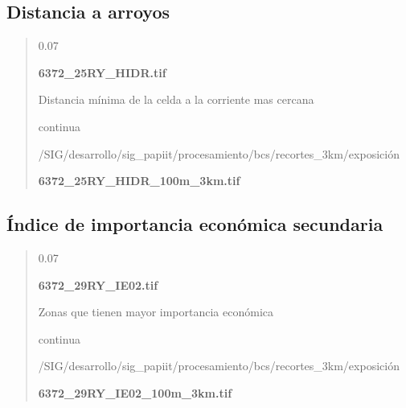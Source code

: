 \documentclass[letterpaper,10pt,spanish]{sphinxmanual}
\begin{document}
\subsection{Distancia a arroyos}
\label{\detokenize{exposicion_bcs:distancia-a-arroyos}}
\begin{quote}

 0.07

 {\color{red}\bfseries{}\textbar{}6372\_25RY\_HIDR.tif\textbar{}}

 Distancia mínima  de la celda  a la corriente mas cercana

 continua


 /SIG/desarrollo/sig\_papiit/procesamiento/bcs/recortes\_3km/exposición

  {\color{red}\bfseries{}\textbar{}6372\_25RY\_HIDR\_100m\_3km.tif\textbar{}}
\begin{quote}

   \textbar{}\textbar{}
\end{quote}
\end{quote}


\subsection{Índice de importancia económica secundaria}
\label{\detokenize{exposicion_bcs:indice-de-importancia-economica-secundaria}}
\begin{quote}

 0.07

 {\color{red}\bfseries{}\textbar{}6372\_29RY\_IE02.tif\textbar{}}

 Zonas que tienen mayor importancia económica

 continua


 /SIG/desarrollo/sig\_papiit/procesamiento/bcs/recortes\_3km/exposición

  {\color{red}\bfseries{}\textbar{}6372\_29RY\_IE02\_100m\_3km.tif\textbar{}}
\begin{quote}

\end{quote}
\end{quote}
\end{document}
